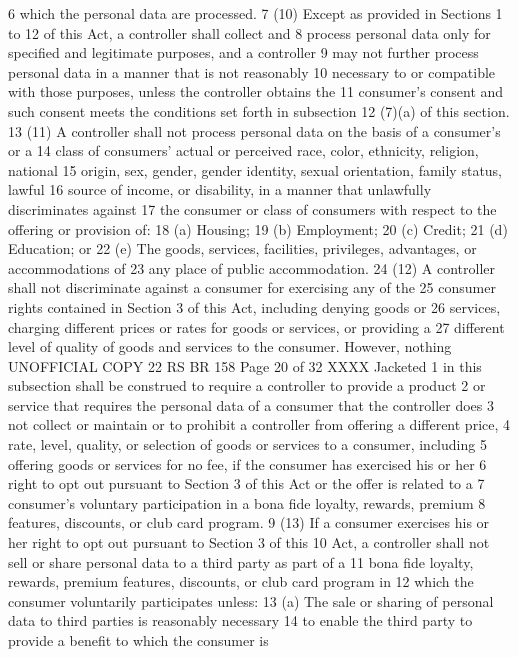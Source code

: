 6 which the personal data are processed.
7 (10) Except as provided in Sections 1 to 12 of this Act, a controller shall collect and
8 process personal data only for specified and legitimate purposes, and a controller
9 may not further process personal data in a manner that is not reasonably
10 necessary to or compatible with those purposes, unless the controller obtains the
11 consumer's consent and such consent meets the conditions set forth in subsection
12 (7)(a) of this section.
13 (11) A controller shall not process personal data on the basis of a consumer's or a
14 class of consumers' actual or perceived race, color, ethnicity, religion, national
15 origin, sex, gender, gender identity, sexual orientation, family status, lawful
16 source of income, or disability, in a manner that unlawfully discriminates against
17 the consumer or class of consumers with respect to the offering or provision of:
18 (a) Housing;
19 (b) Employment;
20 (c) Credit;
21 (d) Education; or
22 (e) The goods, services, facilities, privileges, advantages, or accommodations of
23 any place of public accommodation.
24 (12) A controller shall not discriminate against a consumer for exercising any of the
25 consumer rights contained in Section 3 of this Act, including denying goods or
26 services, charging different prices or rates for goods or services, or providing a
27 different level of quality of goods and services to the consumer. However, nothing 
UNOFFICIAL COPY 22 RS BR 158
Page 20 of 32
XXXX Jacketed
1 in this subsection shall be construed to require a controller to provide a product
2 or service that requires the personal data of a consumer that the controller does
3 not collect or maintain or to prohibit a controller from offering a different price,
4 rate, level, quality, or selection of goods or services to a consumer, including
5 offering goods or services for no fee, if the consumer has exercised his or her
6 right to opt out pursuant to Section 3 of this Act or the offer is related to a
7 consumer's voluntary participation in a bona fide loyalty, rewards, premium
8 features, discounts, or club card program.
9 (13) If a consumer exercises his or her right to opt out pursuant to Section 3 of this
10 Act, a controller shall not sell or share personal data to a third party as part of a
11 bona fide loyalty, rewards, premium features, discounts, or club card program in
12 which the consumer voluntarily participates unless:
13 (a) The sale or sharing of personal data to third parties is reasonably necessary
14 to enable the third party to provide a benefit to which the consumer is
